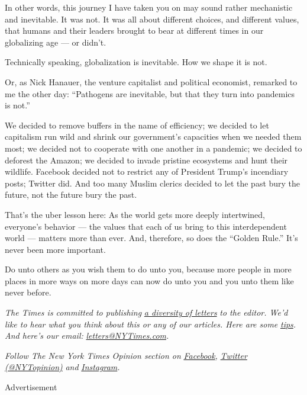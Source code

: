 In other words, this journey I have taken you on may sound rather
mechanistic and inevitable. It was not. It was all about different
choices, and different values, that humans and their leaders brought to
bear at different times in our globalizing age --- or didn't.

Technically speaking, globalization is inevitable. How we shape it is
not.

Or, as Nick Hanauer, the venture capitalist and political economist,
remarked to me the other day: ``Pathogens are inevitable, but that they
turn into pandemics is not.''

We decided to remove buffers in the name of efficiency; we decided to
let capitalism run wild and shrink our government's capacities when we
needed them most; we decided not to cooperate with one another in a
pandemic; we decided to deforest the Amazon; we decided to invade
pristine ecosystems and hunt their wildlife. Facebook decided not to
restrict any of President Trump's incendiary posts; Twitter did. And too
many Muslim clerics decided to let the past bury the future, not the
future bury the past.

That's the uber lesson here: As the world gets more deeply intertwined,
everyone's behavior --- the values that each of us bring to this
interdependent world --- matters more than ever. And, therefore, so does
the ``Golden Rule.'' It's never been more important.

Do unto others as you wish them to do unto you, because more people in
more places in more ways on more days can now do unto you and you unto
them like never before.

\emph{The Times is committed to publishing}
\href{https://www.nytimes3xbfgragh.onion/2019/01/31/opinion/letters/letters-to-editor-new-york-times-women.html}{\emph{a
diversity of letters}} \emph{to the editor. We'd like to hear what you
think about this or any of our articles. Here are some}
\href{https://help.nytimes3xbfgragh.onion/hc/en-us/articles/115014925288-How-to-submit-a-letter-to-the-editor}{\emph{tips}}\emph{.
And here's our email:}
\href{mailto:letters@NYTimes.com}{\emph{letters@NYTimes.com}}\emph{.}

\emph{Follow The New York Times Opinion section on}
\href{https://www.facebookcorewwwi.onion/nytopinion}{\emph{Facebook}}\emph{,}
\href{http://twitter.com/NYTOpinion}{\emph{Twitter (@NYTopinion)}}
\emph{and}
\href{https://www.instagram.com/nytopinion/}{\emph{Instagram}}\emph{.}

Advertisement

